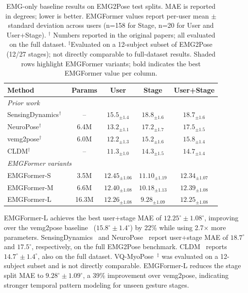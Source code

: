 \documentclass{article}
\newcommand{\model}{EMGFormer}
\begin{document}
\begin{table}[h]
\centering
\caption{EMG-only baseline results on EMG2Pose test splits. MAE is reported in degrees; lower is better. \model{} values report per-user mean $\pm$ standard deviation across users (n=158 for Stage, n=20 for User and User+Stage). $^\dagger$ Numbers reported in the original papers; all evaluated on the full dataset. $^\ddagger$Evaluated on a 12-subject subset of EMG2Pose (12/27 stages); not directly comparable to full-dataset results. Shaded rows highlight \model{} variants; bold indicates the best \model{} value per column.}
\label{tab:emg2pose_results}
\footnotesize
\setlength{\tabcolsep}{3.5pt}
\renewcommand{\arraystretch}{1.05}
\begin{tabular}{lcccc}
\toprule
Method & Params & User & Stage & User+Stage \\
\midrule
\multicolumn{5}{l}{\textit{Prior work}} \\
\midrule
SensingDynamics$^\dagger$~\citep{sensingdynamics} & -- & $15.5_{\pm1.4}$ & $18.8_{\pm1.6}$ & $18.7_{\pm1.6}$ \\
NeuroPose$^\dagger$ & 6.4M & $13.2_{\pm1.1}$ & $17.2_{\pm1.7}$ & $17.5_{\pm1.5}$ \\
vemg2pose$^\dagger$ & 6.0M & $12.2_{\pm1.3}$ & $15.2_{\pm1.6}$ & $15.8_{\pm1.4}$ \\
CLDM$^\dagger$~\citep{emg2tendon} & -- & $11.3_{\pm1.0}$ & $14.3_{\pm1.5}$ & $14.7_{\pm1.4}$ \\

\midrule
\multicolumn{5}{l}{\textit{\model{} variants}} \\
\midrule
\model{}-S & 3.5M & $12.45_{\pm1.06}$ & $11.10_{\pm1.19}$ & $12.34_{\pm1.07}$ \\
\model{}-M & 6.6M & $12.40_{\pm1.08}$ & $10.18_{\pm1.13}$ & $12.39_{\pm1.08}$ \\
\model{}-L & 16.3M & $\mathbf{12.26_{\pm1.08}}$ & $\mathbf{9.28_{\pm1.09}}$ & $\mathbf{12.25_{\pm1.08}}$ \\
\bottomrule
\end{tabular}
\end{table}

\model{}-L achieves the best user+stage MAE of $12.25^\circ \pm 1.08^\circ$, improving over the vemg2pose baseline~\citep{emg2pose} ($15.8^\circ \pm 1.4^\circ$) by 22\% while using 2.7$\times$ more parameters. SensingDynamics~\citep{sensingdynamics} and NeuroPose~\citep{liu2021neuropose} report user+stage MAE of $18.7^\circ$ and $17.5^\circ$, respectively, on the full EMG2Pose benchmark. CLDM~\citep{emg2tendon} reports $14.7^\circ \pm 1.4^\circ$, also on the full dataset. VQ-MyoPose~\citep{vqmyopose}$^\ddagger$ was evaluated on a 12-subject subset and is not directly comparable. \model{}-L reduces the stage split MAE to $9.28^\circ \pm 1.09^\circ$, a 39\% improvement over vemg2pose, indicating stronger temporal pattern modeling for unseen gesture stages.
\end{document}
